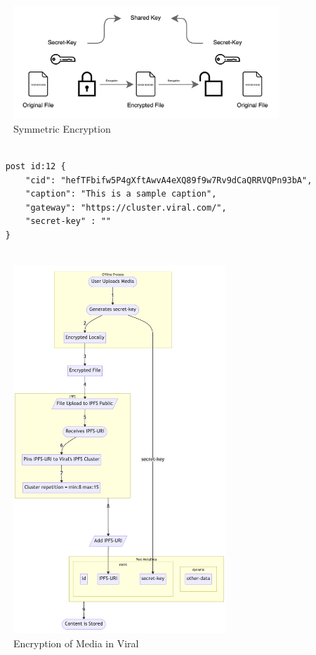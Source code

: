 \documentclass[10pt]{article}
\begin{document}
\begin{figure}[H]
\begin{center}
\includegraphics[width=10cm]{aes}
\caption{Symmetric Encryption}
\end{center}
\end{figure}

\begin{lstlisting}[caption={Post Meta-Data}, numbers=none]

	post id:12 {
    	"cid": "hefTFbifw5P4gXftAwvA4eXQ89f9w7Rv9dCaQRRVQPn93bA",
   		"caption": "This is a sample caption",
    	"gateway": "https://cluster.viral.com/",
    	"secret-key" : ""
	}
	
\end{lstlisting}



\begin{figure}[H]
\begin{center}
\includegraphics[width=8cm]{encryption}
\caption{Encryption of Media in Viral}
\end{center}
\end{figure}
\end{document}
